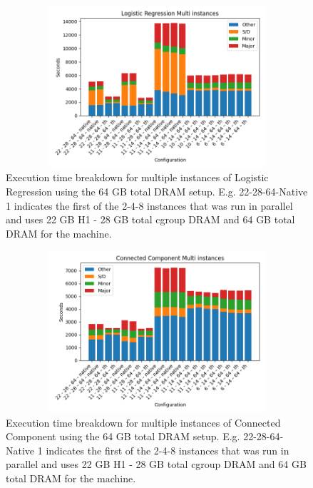 \begin{figure}[ht]
        \includegraphics[width=13cm,height=6cm]{./fig/logr64.png}
    \caption{Execution time breakdown for multiple instances of
    Logistic Regression using the 64 GB total DRAM setup. E.g.
    22-28-64-Native 1 indicates the first of the 2-4-8 instances that
    was run in parallel and uses 22 GB H1 - 28 GB total cgroup DRAM
    and 64 GB total DRAM for the machine.}
	\label{fig:logr64}
\end{figure}

\begin{figure}[ht]
        \includegraphics[width=13cm,height=6cm]{./fig/cc64.png}
    \caption{Execution time breakdown for multiple instances of
    Connected Component using the 64 GB total DRAM setup. E.g.
    22-28-64-Native 1 indicates the first of the 2-4-8 instances that
    was run in parallel and uses 22 GB H1 - 28 GB total cgroup DRAM
    and 64 GB total DRAM for the machine.}
	\label{fig:cc64}
\end{figure}

